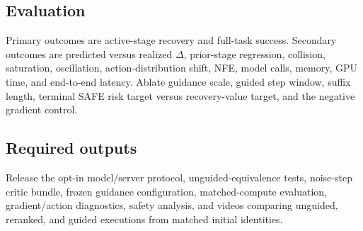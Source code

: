 \subsection{Evaluation}

Primary outcomes are active-stage recovery and full-task success. Secondary outcomes are predicted versus realized $\Delta$, prior-stage regression, collision, saturation, oscillation, action-distribution shift, NFE, model calls, memory, GPU time, and end-to-end latency. Ablate guidance scale, guided step window, suffix length, terminal SAFE risk target versus recovery-value target, and the negative gradient control.



\subsection{Required outputs}

Release the opt-in model/server protocol, unguided-equivalence tests, noise-step critic bundle, frozen guidance configuration, matched-compute evaluation, gradient/action diagnostics, safety analysis, and videos comparing unguided, reranked, and guided executions from matched initial identities.
